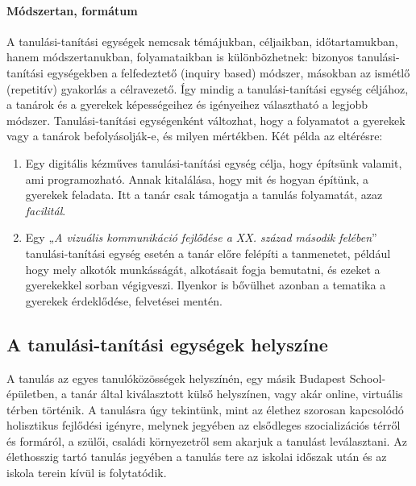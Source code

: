 \hypertarget{modszertan-formatum}{%
\paragraph{Módszertan, formátum}\label{modszertan-formatum}}

A tanulási-tanítási egységek nemcsak témájukban, céljaikban,
időtartamukban, hanem módszertanukban, folyamataikban is különbözhetnek:
bizonyos tanulási-tanítási egységekben a felfedeztető (inquiry based)
módszer, másokban az ismétlő (repetitív) gyakorlás a célravezető. Így
mindig a tanulási-tanítási egység céljához, a tanárok és a gyerekek
képességeihez és igényeihez választható a legjobb módszer.
Tanulási-tanítási egységenként változhat, hogy a folyamatot a gyerekek
vagy a tanárok befolyásolják-e, és milyen mértékben. Két példa az
eltérésre:

\begin{enumerate}
\def\labelenumi{\arabic{enumi}.}
\tightlist
\item
  Egy digitális kézműves tanulási-tanítási egység célja, hogy építsünk
  valamit, ami programozható. Annak kitalálása, hogy mit és hogyan
  építünk, a gyerekek feladata. Itt a tanár csak támogatja a tanulás
  folyamatát, azaz \emph{facilitál}.
\item
  Egy „\emph{A vizuális kommunikáció fejlődése a XX. század második
  felében}'' tanulási-tanítási egység esetén a tanár előre felépíti a
  tanmenetet, például hogy mely alkotók munkásságát, alkotásait fogja
  bemutatni, és ezeket a gyerekekkel sorban végigveszi. Ilyenkor is
  bővülhet azonban a tematika a gyerekek érdeklődése, felvetései mentén.
\end{enumerate}

\hypertarget{a-tanulasi-tanitasi-egysegek-helyszine}{%
\subsection{A tanulási-tanítási egységek
helyszíne}\label{a-tanulasi-tanitasi-egysegek-helyszine}}

A tanulás az egyes tanulóközösségek helyszínén, egy másik Budapest\break
School-épületben, a tanár által kiválasztott külső helyszínen, vagy akár
online, virtuális térben történik. A tanulásra úgy tekintünk, mint az
élethez szorosan kapcsolódó holisztikus fejlődési igényre, melynek
jegyében az elsődleges szocializációs térről és formáról, a szülői,
családi környezetről sem akarjuk a tanulást leválasztani. Az élethosszig
tartó tanulás jegyében a tanulás tere az iskolai időszak után és az
iskola terein kívül is folytatódik.

